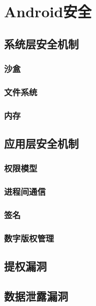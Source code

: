 \chapter{Android安全}

\section{系统层安全机制}
\subsection{沙盒}

\subsection{文件系统}

\subsection{内存}

\section{应用层安全机制}
\subsection{权限模型}

\subsection{进程间通信}

\subsection{签名}

\subsection{数字版权管理}

\section{提权漏洞}

\section{数据泄露漏洞}

